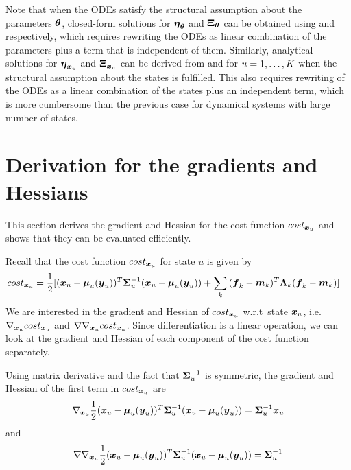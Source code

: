 Note that when the ODEs satisfy the structural assumption about the parameters $\boldsymbol{\theta}$, closed-form solutions for $\boldsymbol{\eta}_{\boldsymbol{\theta}}$ and $\boldsymbol{\Xi}_{\boldsymbol{\theta}}$ can be obtained using  and  respectively, which requires rewriting the ODEs as linear combination of the parameters plus a term that is independent of them.
Similarly, analytical solutions for $\boldsymbol{\eta}_{\boldsymbol{x}_{u}}$ and $\boldsymbol{\Xi}_{\boldsymbol{x}_{u}}$ can be derived from  and  for $u = 1,\dots,K$ when the structural assumption about the states is fulfilled.
This also requires rewriting of the ODEs as a linear combination of the states plus an independent term, which is more cumbersome than the previous case for dynamical systems with large number of states.

\section{Derivation for the gradients and Hessians}
\label{sec-laplace-gradient-and-hessian}

This section derives the gradient and Hessian for the cost function $cost_{\boldsymbol{x}_{u}}$  and shows that they can be evaluated efficiently.

Recall that the cost function $cost_{\boldsymbol{x}_{u}}$ for state $u$ is given by
\begin{align}
    & cost_{\boldsymbol{x}_{u}}
    =
    \frac{1}{2}[(\boldsymbol{x}_{u} - \boldsymbol{\mu}_{u}(\boldsymbol{y}_{u}))^T\boldsymbol{\Sigma}_{u}^{-1}(\boldsymbol{x}_{u} - \boldsymbol{\mu}_{u}(\boldsymbol{y}_{u}))
        + \sum_k{
            (\boldsymbol{f}_{k} - \boldsymbol{m}_{k})^T\boldsymbol{\Lambda}_{k}(\boldsymbol{f}_{k} - \boldsymbol{m}_{k})        
        }]
    \nonumber
\end{align}
We are interested in the gradient and Hessian of $cost_{\boldsymbol{x}_{u}}$ w.r.t\ state $\boldsymbol{x}_{u}$, i.e.\ $\nabla_{\boldsymbol{x}_{u}}cost_{\boldsymbol{x}_{u}}$ and $\nabla\nabla_{\boldsymbol{x}_{u}}cost_{\boldsymbol{x}_{u}}$.
Since differentiation is a linear operation, we can look at the gradient and Hessian of each component of the cost function separately.

Using matrix derivative and the fact that $\boldsymbol{\Sigma}_{u}^{-1}$ is symmetric, the gradient and Hessian of the first term in $cost_{\boldsymbol{x}_{u}}$ are
\begin{align}
    \nabla_{\boldsymbol{x}_{u}}\frac{1}{2}(\boldsymbol{x}_{u} - \boldsymbol{\mu}_{u}(\boldsymbol{y}_{u}))^T\boldsymbol{\Sigma}_{u}^{-1}(\boldsymbol{x}_{u} - \boldsymbol{\mu}_{u}(\boldsymbol{y}_{u})) 
    = \boldsymbol{\Sigma}_{u}^{-1}\boldsymbol{x}_{u}
    \label{eq-laplace-mu-gradient}
\end{align}
and 
\begin{align}
    \nabla\nabla_{\boldsymbol{x}_{u}}\frac{1}{2}(\boldsymbol{x}_{u} - \boldsymbol{\mu}_{u}(\boldsymbol{y}_{u}))^T\boldsymbol{\Sigma}_{u}^{-1}(\boldsymbol{x}_{u} - \boldsymbol{\mu}_{u}(\boldsymbol{y}_{u})) 
    = \boldsymbol{\Sigma}_{u}^{-1}
    \label{eq-laplace-mu-hessian}
\end{align}

